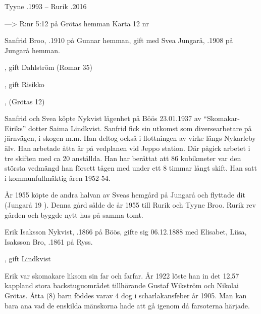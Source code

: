 Tyyne .1993  --  Rurik .2016


--->    R:nr 5:12		på Grötas hemman  	 Karta 12    nr 


Sanfrid Broo, .1910 på Gunnar hemman, gift med Svea Jungarå, .1908 på Jungarå hemman.
\begin{jhchildren}
  \item {}, gift Dahlström (Romar 35)
  \item {}, gift Risikko
  \item {}, (Grötas 12)
\end{jhchildren}
Sanfrid och Svea köpte Nykvist lägenhet på Böös 23.01.1937 av ``Skomakar-Eiriks'' dotter Saima Lindkvist. Sanfrid fick sin utkomst som diversearbetare på järnvägen, i skogen m.m.	Han deltog också i flottningen av virke längs Nykarleby älv. Han arbetade åtta år på vedplanen vid Jeppo station. Där pågick arbetet i tre skiften med ca 20 anställda. Han har berättat att 86 kubikmeter var den största vedmängd han försett tågen med under ett 8 timmar långt skift. Han satt i kommunfullmäktig åren 1952-54.


År 1955 köpte de andra halvan av Sveas hemgård på Jungarå och flyttade dit (Jungarå  19 ). Denna  gård sålde de år 1955 till Rurik och Tyyne Broo. Rurik rev gården och byggde nytt hus på samma tomt.


Erik Isaksson Nykvist, .1866 på Böös, gifte sig 06.12.1888 med Elisabet, Liisa, Isaksson Bro, .1861 på Ryss.
\begin{jhchildren}
  \item {}
  \item {}
  \item {}
  \item {}
  \item {}
  \item {}
  \item {}
  \item {}, gift Lindkvist
\end{jhchildren}
Erik var skomakare liksom sin far och farfar. År 1922 löste han in det 12,57 kappland stora backstuguområdet tillhörande Gustaf Wikström 	och Nikolai Grötas. Åtta (8) barn föddes varav 4 dog i scharlakansfeber år 1905. Man kan bara ana vad de enskilda mänskorna hade att gå igenom då farsoterna härjade.

